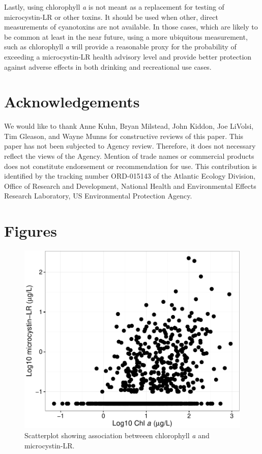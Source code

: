 \documentclass[10pt,a4paper,twocolumn]{article}
\begin{document}
Lastly, using chlorophyll \emph{a} is not meant as a replacement for
testing of microcystin-LR or other toxins. It should be used when other,
direct measurements of cyanotoxins are not available. In those cases,
which are likely to be common at least in the near future, using a more
ubiquitous measurement, such as chlorophyll \emph{a} will provide a
reasonable proxy for the probability of exceeding a microcystin-LR
health advisory level and provide better protection against adverse
effects in both drinking and recreational use cases.

\section{Acknowledgements}\label{acknowledgements}

We would like to thank Anne Kuhn, Bryan Milstead, John Kiddon, Joe
LiVolsi, Tim Gleason, and Wayne Munns for constructive reviews of this
paper. This paper has not been subjected to Agency review. Therefore, it
does not necessary reflect the views of the Agency. Mention of trade
names or commercial products does not constitute endorsement or
recommendation for use. This contribution is identified by the tracking
number ORD-015143 of the Atlantic Ecology Division, Office of Research
and Development, National Health and Environmental Effects Research
Laboratory, US Environmental Protection Agency.

\newpage

\section{Figures}\label{figures}

\begin{figure}[htbp]
\centering
\includegraphics{manuscript_files/figure-latex/chla_micro_scatter-1.pdf}
\caption{Scatterplot showing association betweeen chlorophyll \textit{a}
and microcystin-LR. \label{fig:chla_micro_scatter}}
\end{figure}
\end{document}
